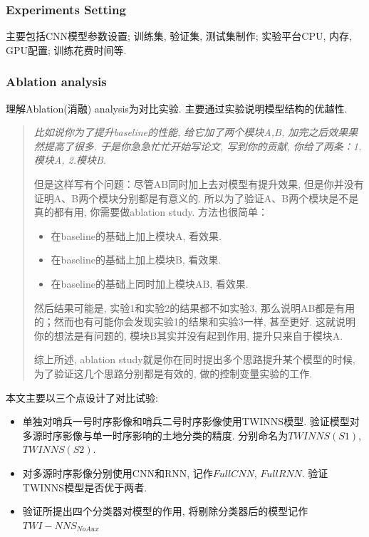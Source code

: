 \subsubsection{Experiments Setting}
主要包括CNN模型参数设置; 训练集, 验证集, 测试集制作; 实验平台CPU, 内存, GPU配置; 训练花费时间等.

\subsubsection{Ablation analysis}
理解Ablation(消融) analysis为对比实验. 主要通过实验说明模型结构的优越性.
\begin{quotation}
    \itshape
    比如说你为了提升baseline的性能, 给它加了两个模块A,B, 加完之后效果果然提高了很多. 于是你急急忙忙开始写论文, 写到你的贡献, 你给了两条：1.模块A, 2.模块B. 
    
    但是这样写有个问题：尽管AB同时加上去对模型有提升效果, 但是你并没有证明A、B两个模块分别都是有意义的. 所以为了验证A、B两个模块是不是真的都有用, 你需要做ablation study. 方法也很简单：
    \begin{itemize}
        \item 在baseline的基础上加上模块A, 看效果. 
        \item 在baseline的基础上加上模块B, 看效果. 
        \item 在baseline的基础上同时加上模块AB, 看效果. 
    \end{itemize}
    
    然后结果可能是, 实验1和实验2的结果都不如实验3, 那么说明AB都是有用的；然而也有可能你会发现实验1的结果和实验3一样, 甚至更好. 这就说明你的想法是有问题的, 模块B其实并没有起到作用, 提升只来自于模块A. 
    
    综上所述, ablation study就是你在同时提出多个思路提升某个模型的时候, 为了验证这几个思路分别都是有效的, 做的控制变量实验的工作. 
\end{quotation}

本文主要以三个点设计了对比试验:
\begin{itemize}
    \item 单独对哨兵一号时序影像和哨兵二号时序影像使用TWINNS模型. 验证模型对多源时序影像与单一时序影响的土地分类的精度. 分别命名为$TWINNS(S1)$, $TWINNS(S2)$.
    \item 对多源时序影像分别使用CNN和RNN, 记作$FullCNN$, $FullRNN$. 验证TWINNS模型是否优于两者.
    \item 验证所提出四个分类器对模型的作用, 将剔除分类器后的模型记作$TWI-NNS_{NoAux}$
\end{itemize}

